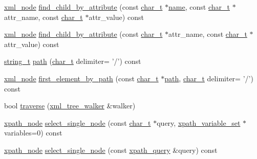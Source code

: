 \begin{DoxyCompactItemize}
\item 
\hyperlink{classpugi_1_1xml__node}{xml\-\_\-node} \hyperlink{classpugi_1_1xml__node_adcbe6392a84e4d156cca69c8ec3224da}{find\-\_\-child\-\_\-by\-\_\-attribute} (const \hyperlink{namespacepugi_aef5a7a62cba0507542220ea15afe39df}{char\-\_\-t} $\ast$\hyperlink{classpugi_1_1xml__node_ac765caace42ecf252d90aea81e09df57}{name}, const \hyperlink{namespacepugi_aef5a7a62cba0507542220ea15afe39df}{char\-\_\-t} $\ast$attr\-\_\-name, const \hyperlink{namespacepugi_aef5a7a62cba0507542220ea15afe39df}{char\-\_\-t} $\ast$attr\-\_\-value) const 
\item 
\hyperlink{classpugi_1_1xml__node}{xml\-\_\-node} \hyperlink{classpugi_1_1xml__node_a96377b213e80a99cc21db911610b88e0}{find\-\_\-child\-\_\-by\-\_\-attribute} (const \hyperlink{namespacepugi_aef5a7a62cba0507542220ea15afe39df}{char\-\_\-t} $\ast$attr\-\_\-name, const \hyperlink{namespacepugi_aef5a7a62cba0507542220ea15afe39df}{char\-\_\-t} $\ast$attr\-\_\-value) const 
\item 
\hyperlink{namespacepugi_a053b39a84c8bb031ff3973d1954a876c}{string\-\_\-t} \hyperlink{classpugi_1_1xml__node_ae5694be88058346ad8e6e418410d4979}{path} (\hyperlink{namespacepugi_aef5a7a62cba0507542220ea15afe39df}{char\-\_\-t} delimiter= '/') const 
\item 
\hyperlink{classpugi_1_1xml__node}{xml\-\_\-node} \hyperlink{classpugi_1_1xml__node_ae701cc3920f4a779610f94219bb41fe1}{first\-\_\-element\-\_\-by\-\_\-path} (const \hyperlink{namespacepugi_aef5a7a62cba0507542220ea15afe39df}{char\-\_\-t} $\ast$\hyperlink{classpugi_1_1xml__node_ae5694be88058346ad8e6e418410d4979}{path}, \hyperlink{namespacepugi_aef5a7a62cba0507542220ea15afe39df}{char\-\_\-t} delimiter= '/') const 
\item 
bool \hyperlink{classpugi_1_1xml__node_a951d5d02987f75fabc4d575cfdeec8b4}{traverse} (\hyperlink{classpugi_1_1xml__tree__walker}{xml\-\_\-tree\-\_\-walker} \&walker)
\item 
\hyperlink{classpugi_1_1xpath__node}{xpath\-\_\-node} \hyperlink{classpugi_1_1xml__node_a51ae1ebf6d78f80f9e91f5d64c143d78}{select\-\_\-single\-\_\-node} (const \hyperlink{namespacepugi_aef5a7a62cba0507542220ea15afe39df}{char\-\_\-t} $\ast$query, \hyperlink{classpugi_1_1xpath__variable__set}{xpath\-\_\-variable\-\_\-set} $\ast$variables=0) const 
\item 
\hyperlink{classpugi_1_1xpath__node}{xpath\-\_\-node} \hyperlink{classpugi_1_1xml__node_a94b942e9f4438836b62d260ee65ab43f}{select\-\_\-single\-\_\-node} (const \hyperlink{classpugi_1_1xpath__query}{xpath\-\_\-query} \&query) const 

\end{DoxyCompactItemize}
